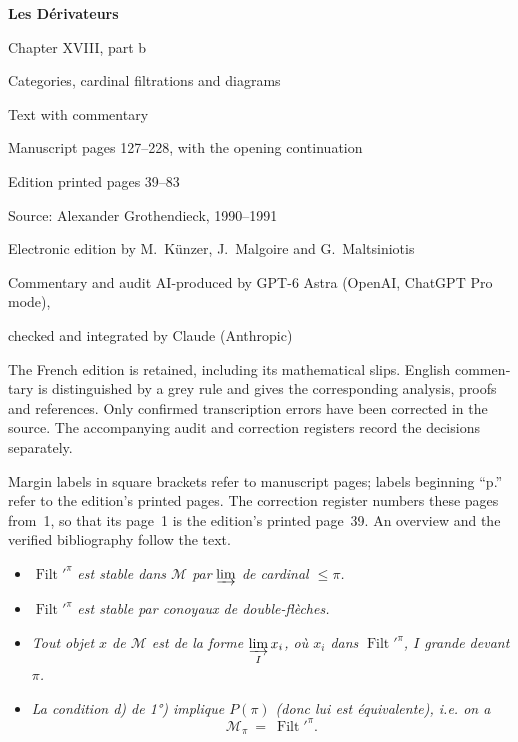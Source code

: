 \documentclass[11pt]{article}
\newcommand{\printedpage}[1]{\marginpar{\footnotesize p.~#1}}
\newcommand{\Filt}{\operatorname{Filt}}
\begin{document}
\begin{otherlanguage}{english}
\thispagestyle{empty}
\vspace*{22mm}
\begin{center}
{\Huge\bfseries Les D\'erivateurs\par}
\vspace{8mm}
{\Large Chapter XVIII, part b\par}
\vspace{5mm}
{\large Categories, cardinal filtrations and diagrams\par}
\vspace{14mm}
{\Large Text with commentary\par}
\vspace{7mm}
{Manuscript pages 127--228, with the opening continuation\par}
{Edition printed pages 39--83\par}
\vspace{17mm}
{Source: Alexander Grothendieck, 1990--1991\par}
{Electronic edition by M.~K\"unzer, J.~Malgoire and G.~Maltsiniotis\par}
\vspace{9mm}
{Commentary and audit AI-produced by GPT-6 Astra (OpenAI, ChatGPT Pro mode),\par}
{checked and integrated by Claude (Anthropic)\par}
\end{center}
\vfill
\noindent The French edition is retained, including its mathematical slips. English commentary is distinguished by a grey rule and gives the corresponding analysis, proofs and references. Only confirmed transcription errors have been corrected in the source. The accompanying audit and correction registers record the decisions separately.

\medskip
\noindent Margin labels in square brackets refer to manuscript pages; labels beginning ``p.'' refer to the edition's printed pages. The correction register numbers these pages from~1, so that its page~1 is the edition's printed page~39. An overview and the verified bibliography follow the text.
\vspace{10mm}
\end{otherlanguage}
\clearpage

\setcounter{footnote}{49}

\printedpage{39}

\begin{itemize}
\item[\textit{1)}] $\Filt'^{\pi}$ \textit{est stable dans $\mathcal{M}$ par} $\varinjlim$ \textit{de cardinal $\leqslant \pi$.}
\item[\textit{1$'$)}] $\Filt'^{\pi}$ \textit{est stable par conoyaux de double-flèches.}
\item[\textit{2)}] \textit{Tout objet $x$ de $\mathcal{M}$ est de la forme $\varinjlim\limits_{I} x_i$, où $x_i$ dans} $\Filt'^{\pi}$\textit{, $I$ grande devant $\pi$.}
\item[\textit{3)}] \textit{La condition d) de 1°) implique $P(\pi)$ (donc lui est équivalente), i.e. on a}
\[ \mathcal{M}_{\pi} \ = \ \Filt'^{\pi}. \]
\end{itemize}
\end{document}
